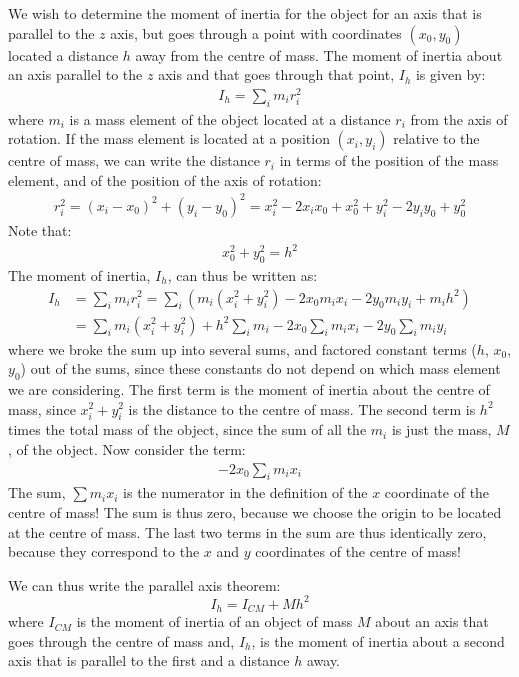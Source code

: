 We wish to determine the moment of inertia for the object for an axis that is parallel to the $z$ axis, but goes through a point with coordinates $(x_0,y_0)$ located a distance $h$ away from the centre of mass. The moment of inertia about an axis parallel to the $z$ axis and that goes through that point, $I_h$ is given by:
\begin{align*}
I_h = \sum_i m_i r_i^2
\end{align*}
where $m_i$ is a mass element of the object located at a distance $r_i$ from the axis of rotation. If the mass element is located at a position $(x_i,y_i)$ relative to the centre of mass, we can write the distance $r_i$ in terms of the position of the mass element, and of the position of the axis of rotation:
\begin{align*}
r_i^2 = (x_i-x_0)^2+(y_i-y_0)^2 = x_i^2-2x_ix_0+x_0^2+y_i^2-2y_iy_0+y_0^2
\end{align*}
Note that:
\begin{align*}
x_0^2 + y_0^2 = h^2
\end{align*}
The moment of inertia, $I_h$, can thus be written as:
\begin{align*}
I_h &= \sum_i m_i r_i^2 =\sum_i (m_i(x_i^2+ y_i^2)-2x_0m_ix_i-2y_0m_iy_i+m_ih^2)\\
&=\sum_i m_i(x_i^2+ y_i^2) + h^2\sum_i m_i - 2x_0 \sum_im_ix_i- 2y_0 \sum_im_iy_i
\end{align*}
where we broke the sum up into several sums, and factored constant terms ($h$, $x_0$, $y_0$) out of the sums, since these constants do not depend on which mass element we are considering. The first term is the moment of inertia about the centre of mass, since $x_i^2+y_i^2$ is the distance to the centre of mass. The second term is $h^2$ times the total mass of the object, since the sum of all the $m_i$ is just the mass, $M$, of the object. Now consider the term:
\begin{align*}
-2x_0 \sum_im_ix_i
\end{align*}
The sum, $\sum m_i x_i$ is the numerator in the definition of the $x$ coordinate of the centre of mass! The sum is thus zero, because we choose the origin to be located at the centre of mass. The last two terms in the sum are thus identically zero, because they correspond to the $x$ and $y$ coordinates of the centre of mass!

We can thus write the parallel axis theorem:
\begin{equation}
\boxed{I_h = I_{CM} + Mh^2}
\end{equation}
where $I_{CM}$ is the moment of inertia of an object of mass $M$ about an axis that goes through the centre of mass and, $I_h$, is the moment of inertia about a second axis that is parallel to the first and a distance $h$ away.

